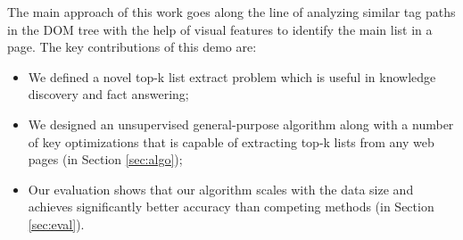  


The main approach of this work goes along the line of 
analyzing similar tag paths in the DOM tree with the help of
visual features to identify the main list in a page. 
The key contributions of this demo are:
\begin{itemize}
\item We defined a novel top-k list extract problem which is useful in
knowledge discovery and fact answering; 
\item We designed an unsupervised general-purpose algorithm along with
a number of key optimizations that is capable of extracting top-k 
lists from any web pages (in Section \ref{sec:algo});
\item Our evaluation shows that our algorithm scales with the data size
and achieves significantly better accuracy than competing methods
(in Section \ref{sec:eval}).
\end{itemize}
